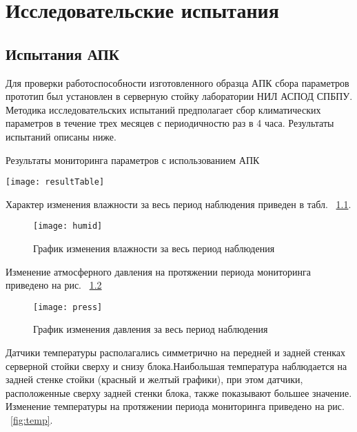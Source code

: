 \begingroup
\renewcommand{\cleardoublepage}{}
\renewcommand{\clearpage}{}
\vspace{1em}
\chapter{Исследовательские испытания}
\endgroup

\section{Испытания АПК}
Для проверки работоспособности изготовленного образца АПК сбора параметров прототип был установлен в серверную стойку лаборатории НИЛ АСПОД СПБПУ. Методика исследовательских испытаний предполагает сбор климатических параметров в течение трех месяцев с периодичностю раз в 4 часа. Результаты испытаний описаны ниже.
 
\begin{table}
	\captionsetup{skip=5pt}
	\caption{Результаты мониторинга параметров с использованием АПК}
	\centering
	\texttt{[image: resultTable]}
	\label{tab:result}
\end{table}

Характер  изменения влажности  за  весь  период  наблюдения  приведен в табл. ~\ref{fig:humid}.

\begin{figure}[h]
	\centering
	\texttt{[image: humid]}
	\caption{График изменения влажности за весь период наблюдения}
	\label{fig:humid}
\end{figure}

Изменение  атмосферного давления  на протяжении периода мониторинга приведено на рис. ~\ref{fig:press}

 \begin{figure}[h]
 	\centering
 	\texttt{[image: press]}
 	\caption{График изменения давления за весь период наблюдения}
 	\label{fig:press}
 \end{figure}

Датчики  температуры  располагались  симметрично  на  передней  и задней стенках серверной стойки сверху и снизу блока.Наибольшая  температура  наблюдается  на  задней  стенке  стойки (красный и желтый графики),  при этом датчики, расположенные сверху задней стенки блока, также показывают большее  значение.  Изменение  температуры  на  протяжении  периода 
мониторинга приведено на рис. ~\ref{fig:temp}.

